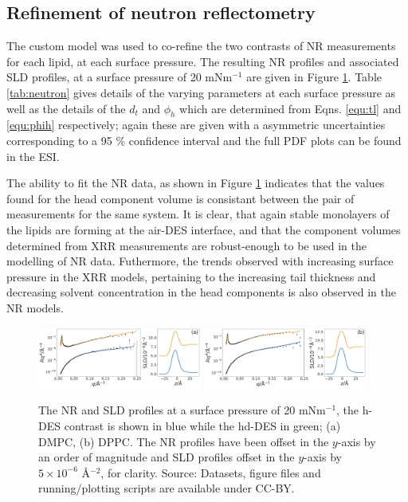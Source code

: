 \documentclass[twoside,twocolumn,9pt]{article}
\begin{document}
\subsection{Refinement of neutron reflectometry}
The custom model was used to co-refine the two contrasts of NR measurements for each lipid, at each surface pressure. The resulting NR profiles and associated SLD profiles, at a surface pressure of 20 mNm$^{-1}$ are given in Figure \ref{fig:neutron}. Table \ref{tab:neutron} gives details of the varying parameters at each surface pressure as well as the details of the $d_t$ and $\phi_h$ which are determined from Eqns. \ref{equ:tl} and \ref{equ:phih} respectively; again these are given with a asymmetric uncertainties corresponding to a 95 \% confidence interval and the full PDF plots can be found in the ESI.

The ability to fit the NR data, as shown in Figure \ref{fig:neutron} indicates that the values found for the head component volume is consistant between the pair of measurements for the same system. It is clear, that again stable monolayers of the lipids are forming at the air-DES interface, and that the component volumes determined from XRR measurements are robust-enough to be used in the modelling of NR data. Futhermore, the trends observed with increasing surface pressure in the XRR models, pertaining to the increasing tail thickness and decreasing solvent concentration in the head components is also observed in the NR models.
%
\begin{figure}
	\centering
	\includegraphics[width=0.48\textwidth]{figures/nDMPC20_all_data}
	\includegraphics[width=0.48\textwidth]{figures/nDPPC20_all_data}
	\caption{The NR and SLD profiles at a surface pressure of 20 mNm$^{-1}$, the h-DES contrast is shown in blue while the hd-DES in green; (a) DMPC, (b) DPPC. The NR profiles have been offset in the $y$-axis by an order of magnitude and SLD profiles offset in the $y$-axis by $5\times10^{-6}$ \AA$^{-2}$, for clarity. Source: Datasets, figure files and running/plotting scripts are available under CC-BY.\cite{mccluskey_2018}}
	\label{fig:neutron}
\end{figure}
\end{document}
